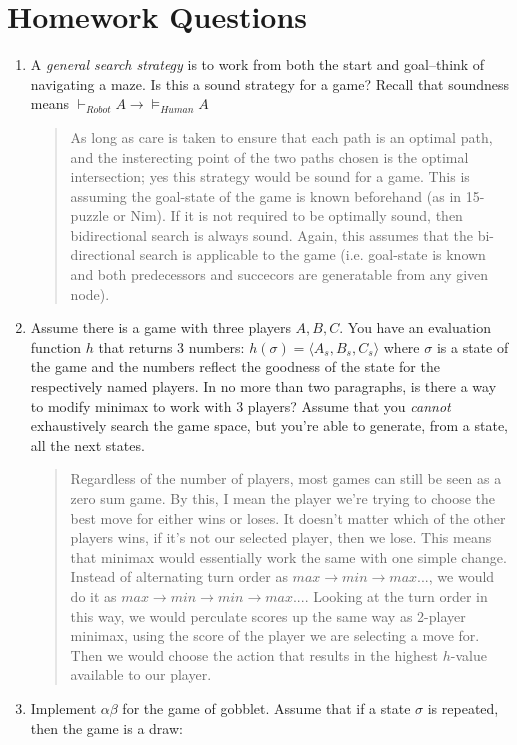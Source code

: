 \documentclass{article}
\begin{document}
\section*{Homework Questions}
\begin{enumerate}
\item A \textit{general search strategy} is to work from both the start and goal--think of navigating a maze. Is this a sound strategy for a game? Recall that soundness means $\vdash_{Robot}A \rightarrow\models_{Human}A$
\begin{quote}
As long as care is taken to ensure that each path is an optimal path, and the insterecting point of the two paths chosen is the optimal intersection; yes this strategy would be sound for a game. This is assuming the goal-state of the game is known beforehand (as in 15-puzzle or Nim). If it is not required to be optimally sound, then bidirectional search is always sound. Again, this assumes that the bi-directional search is applicable to the game (i.e. goal-state is known and both predecessors and succecors are generatable from any given node).
\end{quote}
\item Assume there is a game with three players $A, B, C$. You have an evaluation function $h$ that returns 3 numbers: $h(\sigma) = \langle A_{s} , B_{s} , C_{s}\rangle$ where $\sigma$ is a state of the game and the numbers reflect the goodness of the state for the respectively named players. In no more than two paragraphs, is there a way to modify minimax to work with 3 players? Assume that you \textit{cannot} exhaustively search the game space, but you're able to generate, from a state, all the next states.
\begin{quote}
Regardless of the number of players, most games can still be seen as a zero sum game. By this, I mean the player we're trying to choose the best move for either wins or loses. It doesn't matter which of the other players wins, if it's not our selected player, then we lose. This means that minimax would essentially work the same with one simple change. Instead of alternating turn order as $max \rightarrow min \rightarrow max...$, we would do it as $max\rightarrow min \rightarrow min \rightarrow max...$. Looking at the turn order in this way, we would perculate scores up the same way as 2-player minimax, using the score of the player we are selecting a move for. Then we would choose the action that results in the highest $h$-value available to our player.
\end{quote}
\item Implement $\alpha\beta$ for the game of gobblet. Assume that if a state $\sigma$ is repeated, then the game is a draw:

\end{enumerate}
\end{document}
